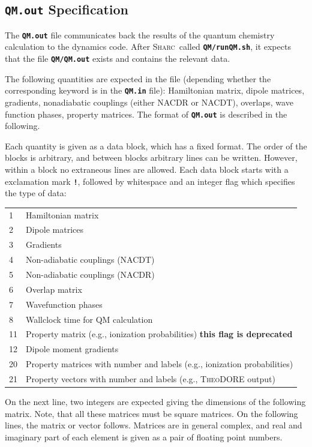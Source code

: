 \documentclass[a4paper,10pt,DIV=15,openany,twoside=false]{scrbook}
\newcommand{\sharc}{\textsc{Sharc}}
\newcommand{\ttt}[1]{\textbf{\texttt{#1}}}
\begin{document}
\subsection{\ttt{QM.out} Specification}\label{intf:qmout}

The \ttt{QM.out} file communicates back the results of the quantum chemistry calculation to the dynamics code. After \sharc\ called \ttt{QM/runQM.sh}, it expects that the file \ttt{QM/QM.out} exists and contains the relevant data.

The following quantities are expected in the file (depending whether the corresponding keyword is in the \ttt{QM.in} file): Hamiltonian matrix, dipole matrices, gradients, nonadiabatic couplings (either NACDR or NACDT), overlaps, wave function phases, property matrices. The format of \ttt{QM.out} is described in the following. 

Each quantity is given as a data block, which has a fixed format. The order of the blocks is arbitrary, and between blocks arbitrary lines can be written. However, within a block no extraneous lines are allowed. Each data block starts with a exclamation mark \ttt{!}, followed by whitespace and an integer flag which specifies the type of data:

\begin{tabular}{ll}
1       &Hamiltonian matrix\\
2       &Dipole matrices\\
3       &Gradients\\
4       &Non-adiabatic couplings (NACDT)\\
5       &Non-adiabatic couplings (NACDR)\\
6       &Overlap matrix\\
7       &Wavefunction phases\\
8       &Wallclock time for QM calculation\\
11      &Property matrix (e.g., ionization probabilities) \quad \textbf{this flag is deprecated}\\
12      &Dipole moment gradients\\
20      &Property matrices with number and labels (e.g., ionization probabilities)\\
21      &Property vectors with number and labels (e.g., \textsc{TheoDORE} output)
\end{tabular}

On the next line, two integers are expected giving the dimensions of the following matrix. Note, that all these matrices must be square matrices. On the following lines, the matrix or vector follows. Matrices are in general complex, and real and imaginary part of each element is given as a pair of floating point numbers.
\end{document}
